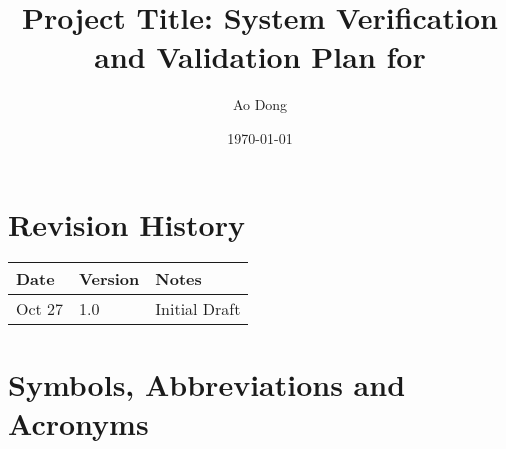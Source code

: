 \documentclass[12pt, titlepage]{article}
\begin{document}
\title{Project Title: System Verification and Validation Plan for \progname{}} 
\author{Ao Dong}
\date{\today}
	
\maketitle


\section{Revision History}

\begin{tabularx}{\textwidth}{p{3cm}p{2cm}X}
\toprule {\bf Date} & {\bf Version} & {\bf Notes}\\
\midrule
Oct 27 & 1.0 & Initial Draft\\
\bottomrule
\end{tabularx}

\newpage

\tableofcontents

\listoftables

\listoffigures

\newpage

\section{Symbols, Abbreviations and Acronyms}
\end{document}
